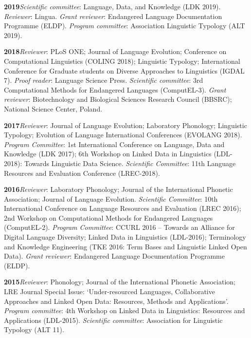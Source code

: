 \documentclass[11pt]{article}
\newcommand{\hangpara}{
 \setlength{\parindent}{0in} %
 \hangindent=0.42in %
}
\begin{document}
\vskip 6pt
\hangpara
{\bf 2019}\hspace{1ex}\textit{Scientific committee}: Language, Data, and Knowledge (LDK 2019). \textit{Reviewer}: Lingua. \textit{Grant reviewer}: Endangered Language Documentation Programme (ELDP). \textit{Program committee}: Association Linguistic Typology (ALT 2019).

\vskip 6pt
\hangpara
{\bf 2018}\hspace{1ex}\textit{Reviewer}: PLoS ONE; Journal of Language Evolution; Conference on Computational Linguistics (COLING 2018); Linguistic Typology; International Conference for Graduate students on Diverse Approaches to Linguistics (IGDAL 7). \textit{Proof reader}: Language Science Press. \textit{Scientific committee}: 3rd Computational Methods for Endangered Languages (ComputEL-3). \textit{Grant reviewer}: Biotechnology and Biological Sciences Research Council (BBSRC); National Science Center, Poland.

\vskip 6pt
\hangpara
{\bf 2017}\hspace{1ex}\textit{Reviewer}: Journal of Language Evolution; Laboratory Phonology; Linguistic Typology; Evolution of Language International Conferences (EVOLANG 2018). \textit{Program Committee}: 1st International Conference on Language, Data and Knowledge (LDK 2017); 6th Workshop on Linked Data in Linguistics (LDL-2018): Towards Linguistic Data Science. \textit{Scientific Committee}: 11th Language Resources and Evaluation Conference (LREC-2018).

\vskip 6pt
\hangpara
{\bf 2016}\hspace{1ex}\textit{Reviewer}: Laboratory Phonology; Journal of the International Phonetic Association; Journal of Language Evolution. \textit{Scientific Committee}: 10th International Conference on Language Resources and Evaluation (LREC 2016); 2nd Workshop on Computational Methods for Endangered Languages (ComputEL-2). \textit{Program Committee}: CCURL 2016 -- Towards an Alliance for Digital Language Diversity; Linked Data in Linguistics (LDL-2016); Terminology and Knowledge Engineering (TKE 2016: Term Bases and Linguistic Linked Open Data). \textit{Grant reviewer}: Endangered Language Documentation Programme (ELDP).


\vskip 6pt
\hangpara
{\bf 2015}\hspace{1ex}\textit{Reviewer}: Phonology; Journal of the International Phonetic Association; LRE Journal Special Issue: `Under-resourced Languages, Collaborative Approaches and Linked Open Data: Resources, Methods and Applications'. \textit{Program committee}: 4th Workshop on Linked Data in Linguistics: Resources and Applications (LDL-2015). \textit{Scientific committee}: Association for Linguistic Typology (ALT 11).
\end{document}
